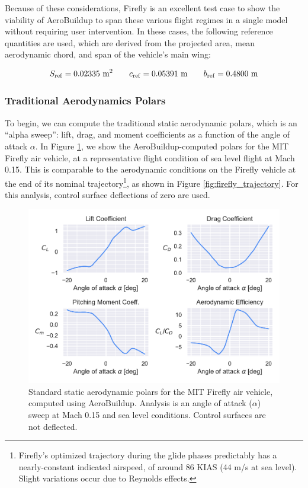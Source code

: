 Because of these considerations, Firefly is an excellent test case to show the viability of AeroBuildup to span these various flight regimes in a single model without requiring user intervention. In these cases, the following reference quantities are used, which are derived from the projected area, mean aerodynamic chord, and span of the vehicle's main wing:

\begin{equation}
    S_{\rm ref} = 0.02335\ \text{m}^2 \qquad c_{\rm ref} = 0.05391\ \text{m} \qquad b_{\rm ref} = 0.4800\ \text{m}
\end{equation}

\subsubsection{Traditional Aerodynamics Polars}

To begin, we can compute the traditional static aerodynamic polars, which is an ``alpha sweep'': lift, drag, and moment coefficients as a function of the angle of attack $\alpha$. In Figure \ref{fig:ab_polars}, we show the AeroBuildup-computed polars for the MIT Firefly air vehicle, at a representative flight condition of sea level flight at Mach 0.15. This is comparable to the aerodynamic conditions on the Firefly vehicle at the end of its nominal trajectory\footnote{Firefly's optimized trajectory during the glide phases predictably has a nearly-constant indicated airspeed, of around 86 KIAS (44 m/s at sea level). Slight variations occur due to Reynolds effects.}, as shown in Figure \ref{fig:firefly_trajectory}. For this analysis, control surface deflections of zero are used.

\begin{figure}[H]
    \centering
    \includegraphics[width=6in]{../figures/aerobuildup_figs/polars.pdf}
    \caption{Standard static aerodynamic polars for the MIT Firefly air vehicle, computed using AeroBuildup. Analysis is an angle of attack ($\alpha$) sweep at Mach 0.15 and sea level conditions. Control surfaces are not deflected.}
    \label{fig:ab_polars}
\end{figure}

